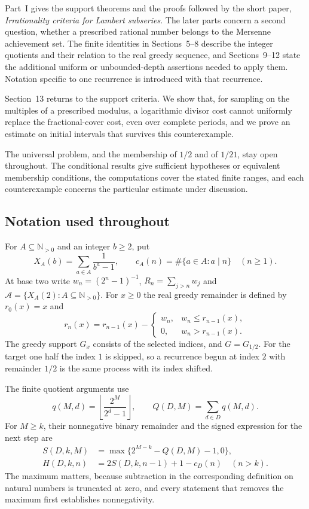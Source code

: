 Part~I gives the support theorems and the proofs followed by the short
paper, \emph{Irrationality criteria for Lambert subseries}. The later
parts concern a second question, whether a prescribed rational number
belongs to the Mersenne achievement set. The finite identities in
Sections~5--8 describe the integer quotients and their relation to the
real greedy sequence, and Sections~9--12 state the additional uniform
or unbounded-depth assertions needed to apply them. Notation specific
to one recurrence is introduced with that recurrence.

Section~13 returns to the support criteria. We show that, for sampling
on the multiples of a prescribed modulus, a logarithmic divisor cost
cannot uniformly replace the fractional-cover cost, even over complete
periods, and we prove an estimate on initial intervals that survives
this counterexample.

The universal problem, and the membership of $1/2$ and of $1/21$, stay
open throughout. The conditional results give sufficient hypotheses or
equivalent membership conditions, the computations cover the stated
finite ranges, and each counterexample concerns the particular estimate
under discussion.

\subsection*{Notation used throughout}
For $A\subseteq\mathbb N_{>0}$ and an integer $b\ge2$, put
\[
 X_A(b)=\sum_{a\in A}\frac1{b^a-1},\qquad
 c_A(n)=\#\{a\in A:a\mid n\}\quad(n\ge1).
\]
At base two write $w_n=(2^n-1)^{-1}$, $R_n=\sum_{j>n}w_j$ and
$\mathcal A=\{X_A(2):A\subseteq\mathbb N_{>0}\}$.  For $x\ge0$ the
real greedy remainder is defined by $r_0(x)=x$ and
\[
 r_n(x)=r_{n-1}(x)-\begin{cases}
 w_n,&w_n\le r_{n-1}(x),\\
 0,&w_n>r_{n-1}(x).
 \end{cases}
\]
The greedy support $G_x$ consists of the selected indices, and
$G=G_{1/2}$. For the target one half the index $1$ is skipped, so a
recurrence begun at index $2$ with remainder $1/2$ is the same process
with its index shifted.

The finite quotient arguments use
\[
 q(M,d)=\left\lfloor\frac{2^M}{2^d-1}\right\rfloor,\qquad
 Q(D,M)=\sum_{d\in D}q(M,d).
\]
For $M\ge k$, their nonnegative binary remainder and the signed
expression for the next step are
\[
 \begin{aligned}
 S(D,k,M)&=\max\{2^{M-k}-Q(D,M)-1,0\},\\
 H(D,k,n)&=2S(D,k,n-1)+1-c_D(n)\quad(n>k).
 \end{aligned}
\]
The maximum matters, because subtraction in the corresponding
definition on natural numbers is truncated at zero, and every statement
that removes the maximum first establishes nonnegativity.

